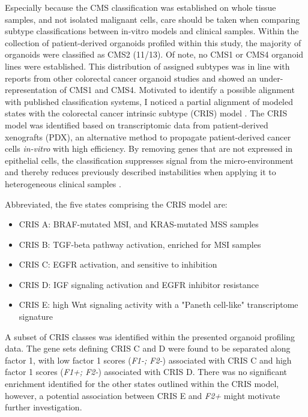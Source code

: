 \begin{flushleft}
Especially because the CMS classification was established on whole tissue samples, and not isolated malignant cells, care should be taken when comparing subtype classifications between in-vitro models and clinical samples. Within the collection of patient-derived organoids profiled within this study, the majority of organoids were classified as CMS2 (11/13). Of note, no CMS1 or CMS4 organoid lines were established. This distribution of assigned subtypes was in line with reports from other colorectal cancer organoid studies \parencite{vandeweteringProspectiveDerivationLiving2015, schutteMolecularDissectionColorectal2017} and showed an under-representation of CMS1 and CMS4. Motivated to identify a possible alignment with published classification systems, I noticed a partial alignment of modeled states with the colorectal cancer intrinsic subtype (CRIS) model \parencite{isellaSelectiveAnalysisCancercell2017a}. The CRIS model was identified based on transcriptomic data from patient-derived xenografts (PDX), an alternative method to propagate patient-derived cancer cells \textit{in-vitro} with high efficiency. By removing genes that are not expressed in epithelial cells, the classification suppresses signal from the micro-environment and thereby reduces previously described instabilities when applying it to heterogeneous clinical samples \parencite{dunneCancercellIntrinsicGene2017}.
\par

Abbreviated, the five states comprising the CRIS model are: 
\begin{itemize} 
    \item CRIS A: BRAF-mutated MSI, and KRAS-mutated MSS samples
    \item CRIS B: TGF-beta pathway activation, enriched for MSI samples 
    \item CRIS C: EGFR activation, and sensitive to inhibition
    \item CRIS D: IGF signaling activation and EGFR inhibitor resistance
    \item CRIS E: high Wnt signaling activity with a "Paneth cell-like" transcriptome signature
\end{itemize}

A subset of CRIS classes was identified within the presented organoid profiling data. The gene sets defining CRIS C and D were found to be separated along factor 1, with low factor 1 scores (\textit{F1-; F2-}) associated with CRIS C and high factor 1 scores (\textit{F1+; F2-}) associated with CRIS D. There was no significant enrichment identified for the other states outlined within the CRIS model, however, a potential association between CRIS E and \textit{F2+} might motivate further investigation.
\smallbreak


\end{flushleft}
